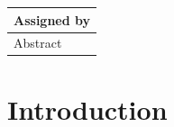 \documentclass{article}
\begin{document}
\begin{table}[]
\begin{tabular}{|l|l|l|}
\multicolumn{3}{|l|}{Assigned by}                                                                                                                                                                                                                                    \\ \hline
\multicolumn{3}{|l|}{\multirow{5}{*}{Abstract}}                                                                                                                                                                                                                      \\
\multicolumn{3}{|l|}{}                                                                                                                                                                                                                                               \\
\multicolumn{3}{|l|}{}                                                                                                                                                                                                                                               \\
\multicolumn{3}{|l|}{}                                                                                                                                                                                                                                               \\
\multicolumn{3}{|l|}{}                                                                                                                                                                                                                                               \\ \hline
\end{tabular}
\end{table}
\clearpage

\doublespacing
\tableofcontents
\pagebreak 
\setcounter{page}{1}
\rhead{\thepage}
\section{Introduction}
\end{document}
